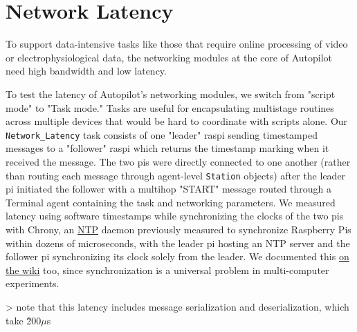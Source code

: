 
\section{Network Latency}
\label{sec:networklatency}

To support data-intensive tasks like those that require online processing of video or electrophysiological data, the networking modules at the core of Autopilot need high bandwidth and low latency. 

To test the latency of Autopilot's networking modules, we switch from "script mode" to "Task mode." Tasks are useful for encapsulating multistage routines across multiple devices that would be hard to coordinate with scripts alone. Our \texttt{Network\_Latency} task consists of one "leader" raspi sending timestamped messages to a "follower" raspi which returns the timestamp marking when it received the message. The two pis were directly connected to one another (rather than routing each message through agent-level \texttt{Station} objects) after the leader pi initiated the follower with a multihop "START" message routed through a Terminal agent containing the task and networking parameters. We measured latency using software timestamps while synchronizing the clocks of the two pis with Chrony, an \href{https://en.wikipedia.org/wiki/Network\_Time\_Protocol}{NTP} daemon previously measured to synchronize Raspberry Pis within dozens of microseconds\citep{soaresAnalysisTimekeepingExperimentation2020}, with the leader pi hosting an NTP server and the follower pi synchronizing its clock solely from the leader. We documented this \href{https://wiki.auto-pi-lot.com/index.php/NTP}{on the wiki} too, since synchronization is a universal problem in multi-computer experiments.

> note that this latency includes message serialization and deserialization, which take \~200$\mu$s